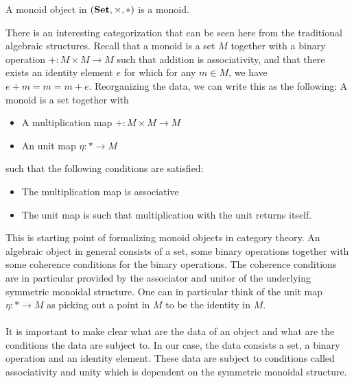 \documentclass[a4paper]{article}
\begin{document}
\begin{prp}{}{} A monoid object in $(\bold{Set},\times,\ast)$ is a monoid. 
\end{prp}

There is an interesting categorization that can be seen here from the traditional algebraic structures. Recall that a monoid is a set $M$ together with a binary operation $+:M\times M\to M$ such that addition is associativity, and that there exists an identity element $e$ for which for any $m\in M$, we have $e+m=m=m+e$. Reorganizing the data, we can write this as the following: A monoid is a set together with 
\begin{itemize}
\item A multiplication map $+:M\times M\to M$
\item An unit map $\eta:\ast\to M$
\end{itemize}
such that the following conditions are satisfied: 
\begin{itemize}
\item The multiplication map is associative
\item The unit map is such that multiplication with the unit returns itself. 
\end{itemize}

This is starting point of formalizing monoid objects in category theory. An algebraic object in general consists of a set, some binary operations together with some coherence conditions for the binary operations. The coherence conditions are in particular provided by the associator and unitor of the underlying symmetric monoidal structure. One can in particular think of the unit map $\eta:\ast\to M$ as picking out a point in $M$ to be the identity in $M$. \\~\\

It is important to make clear what are the data of an object and what are the conditions the data are subject to. In our case, the data consists a set, a binary operation and an identity element. These data are subject to conditions called associativity and unity which is dependent on the symmetric monoidal structure. 
\end{document}
